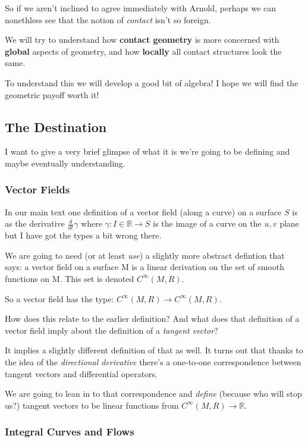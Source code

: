 \documentclass{article}
\begin{document}
So if we aren't inclined to agree immediately with Arnold, perhaps we can nonethless see
that the notion of \textsl{contact} isn't so foreign.

We will try to understand how \textbf{contact geometry} is more concerned with
\textbf{global} aspects of geometry, and how \textbf{locally} all contact
structures look the same.

To understand this we will develop a good bit of algebra! I hope we will find
the geometric payoff worth it!

\subsection {The Destination}

I want to give a very brief glimpse of what it is we're going to be defining and
maybe eventually understanding.

\subsubsection {Vector Fields}

In our main text \cite{toponogov} one definition of a vector field (along a
curve) on a surface $S$ is as the derivative $\frac{d}{dt}\gamma$ where $\gamma : I \in
\mathbb{R} \to S$ is the image of a curve on the $u, v$ plane but I have got the
types a bit wrong there.

We are going to need (or at least \textsl{use}) a slightly more abstract
defintion that says: a vector field on a surface M is a linear derivation on the
set of smooth functions on M. This set is denoted $C^{\infty}(M, R)$.

So a vector field has the type: $C^{\infty}(M, R) \to C^{\infty}(M, R)$.

How does this relate to the earlier definition? And what does that definition of
a vector field imply about the definition of a \textsl{tangent vector}?

It implies a slightly different definition of that as well. It turns out that
thanks to the idea of the \textsl{directional derivative} there's a one-to-one
correspondence between tangent vectors and differential operators.

We are going to lean in to that correspondence and \textsl{define} (because who
will stop us?) tangent vectors to be linear functions from $C^{\infty}(M, R) \to
\mathbb{R}$.

\subsubsection {Integral Curves and Flows}
\end{document}
